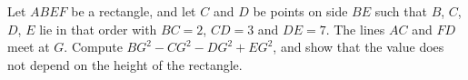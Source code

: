 Let $ABEF$ be a rectangle, and let $C$ and $D$ be points on side $BE$ such that $B$, $C$, $D$, $E$ lie in that order with $BC=2$, $CD=3$ and $DE=7$. The lines $AC$ and $FD$ meet at $G$. Compute $BG^{2}-CG^{2}-DG^{2}+EG^{2}$, and show that the value does not depend on the height of the rectangle.
